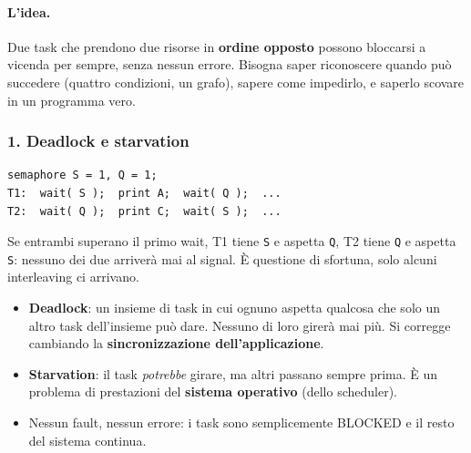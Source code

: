\paragraph*{L'idea.} Due task che prendono due risorse in \textbf{ordine opposto} possono bloccarsi a vicenda per sempre, senza nessun errore. Bisogna saper riconoscere quando può succedere (quattro condizioni, un grafo), sapere come impedirlo, e saperlo scovare in un programma vero.

\subsubsection*{1. Deadlock e starvation}
\begin{lstlisting}[basicstyle=\ttfamily\footnotesize]
semaphore S = 1, Q = 1;
T1:  wait( S );  print A;  wait( Q );  ...
T2:  wait( Q );  print C;  wait( S );  ...
\end{lstlisting}
Se entrambi superano il primo wait, T1 tiene \texttt{S} e aspetta \texttt{Q}, T2 tiene \texttt{Q} e aspetta \texttt{S}: nessuno dei due arriverà mai al signal. È questione di sfortuna, solo alcuni interleaving ci arrivano.
\begin{itemize}
    \item \textbf{Deadlock}: un insieme di task in cui ognuno aspetta qualcosa che solo un altro task dell'insieme può dare. Nessuno di loro girerà mai più. Si corregge cambiando la \textbf{sincronizzazione dell'applicazione}.
    \item \textbf{Starvation}: il task \emph{potrebbe} girare, ma altri passano sempre prima. È un problema di prestazioni del \textbf{sistema operativo} (dello scheduler).
    \item Nessun fault, nessun errore: i task sono semplicemente BLOCKED e il resto del sistema continua.
\end{itemize}

